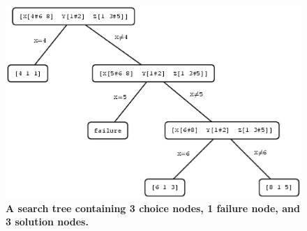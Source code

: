 \documentclass[a4paper]{scrartcl}
\begin{document}
\begin{figure}[htpb]

\centerline{\includegraphics*[scale=0.7]{figs/search-tree-exmpl.eps}}
\caption{{\bf A search tree containing 3 choice nodes, 
1 failure node, and 3 solution nodes.}}
\label{figure3}
\end{figure}
\end{document}
